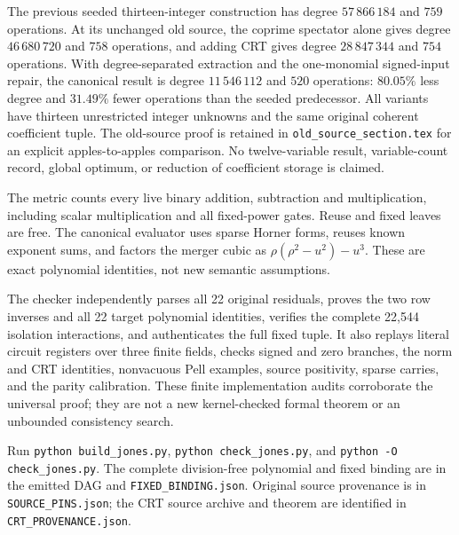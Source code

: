 The previous seeded thirteen-integer construction has degree $57\,866\,184$
and $759$ operations. At its unchanged old source, the coprime spectator
alone gives degree $46\,680\,720$ and $758$ operations, and adding CRT gives
degree $28\,847\,344$ and $754$ operations. With degree-separated extraction
and the one-monomial signed-input repair, the canonical result is degree
$11\,546\,112$ and $520$ operations: $80.05\%$ less degree and $31.49\%$
fewer operations than the seeded predecessor. All variants have thirteen
unrestricted integer unknowns and the same original coherent coefficient
tuple. The old-source proof is retained in
\texttt{old\_source\_section.tex} for an explicit apples-to-apples comparison.
No twelve-variable result, variable-count record, global optimum, or reduction
of coefficient storage is claimed.

The metric counts every live binary addition, subtraction and
multiplication, including scalar multiplication and all fixed-power gates.
Reuse and fixed leaves are free. The canonical evaluator uses sparse Horner
forms, reuses known exponent sums, and factors the merger cubic as
$\rho(\rho^2-u^2)-u^3$. These are exact polynomial identities, not new
semantic assumptions.

The checker independently parses all 22 original residuals, proves the two
row inverses and all 22 target polynomial identities, verifies the complete
22,544 isolation interactions, and authenticates the full fixed tuple. It
also replays literal circuit registers over three finite fields, checks signed
and zero branches, the norm and CRT identities, nonvacuous Pell examples,
source positivity, sparse carries, and the parity calibration. These finite
implementation audits corroborate the universal proof; they are not a new
kernel-checked formal theorem or an unbounded consistency search.

Run \texttt{python build\_jones.py}, \texttt{python check\_jones.py}, and
\texttt{python -O check\_jones.py}. The complete division-free polynomial and
fixed binding are in the emitted DAG and \texttt{FIXED\_BINDING.json}.
Original source provenance is in \texttt{SOURCE\_PINS.json}; the CRT source
archive and theorem are identified in \texttt{CRT\_PROVENANCE.json}.

